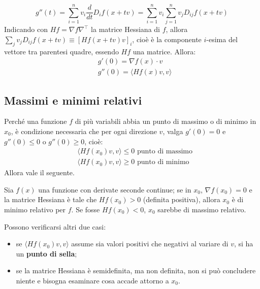 \documentclass[10pt, a4paper]{scrartcl}
\theoremstyle{definition}
\numberwithin{esempio}{section}
\theoremstyle{definition}
\numberwithin{obs}{section}
\numberwithin{nota}{section}
\numberwithin{equation}{subsection}
\begin{document}
\begin{equation}
	g''(t)	= \sum_{i=1}^{n} v_i \frac{d }{d t} D_i f (x+tv) = \sum_{i=1}^{n} v_i \sum_{j=1}^{n} v_j D_{ij} f(x+tv)
\end{equation}
Indicando con $Hf = \nabla f \nabla ^\top$ la matrice Hessiana di $f$, allora $\sum_{j}^{} v_j D_{ij} f(x+tv) \equiv \left[ Hf(x+tv) v\right]_i $, cio\`e \`e la componente $i$-esima del vettore tra parentesi quadre, essendo $Hf$ una matrice. Allora:
\begin{equation}
	\begin{split}
		&g'(0) = \nabla f(x) \cdot v \\ 
		& g''(0) = \langle Hf(x) v , v \rangle
	\end{split}
\end{equation}
 
\subsection{Massimi e minimi relativi}

Perch\'e una funzione $f$ di pi\`u variabili abbia un punto di massimo o di minimo in $x_0$, \`e condizione necessaria che per ogni direzione $v$, valga $g'(0) = 0$ e $g''(0) \le 0$ o $g''(0) \ge 0$, cio\`e:
\begin{equation}
	\begin{split}
		&\langle Hf (x_0) v , v \rangle \le 0 \text{ punto di massimo}\\
		&\langle Hf (x_0) v , v \rangle \ge 0 \text{ punto di minimo}
	\end{split}
\end{equation}
Allora vale il seguente.
\begin{teorema}
	{}{}
	Sia $f(x)$ una funzione con derivate seconde continue; se in $x_0$, $\nabla f (x_0) = 0$ e la matrice Hessiana \`e tale che $Hf(x_0) > 0$ (definita positiva), allora $x_0$ \`e di minimo relativo per $f$. Se fosse $Hf(x_0) < 0$, $x_0$ sarebbe di massimo relativo.
\end{teorema}
\noindent Possono verificarsi altri due casi:
\begin{itemize}
	\item se $\langle H f(x_0)v ,v \rangle $ assume sia valori positivi che negativi al variare di $v$, si ha un \textbf{punto di sella};
	\item se la matrice Hessiana \`e semidefinita, ma non definita, non si pu\`o concludere niente e bisogna esaminare cosa accade attorno a $x_0$.
\end{itemize}
\end{document}

